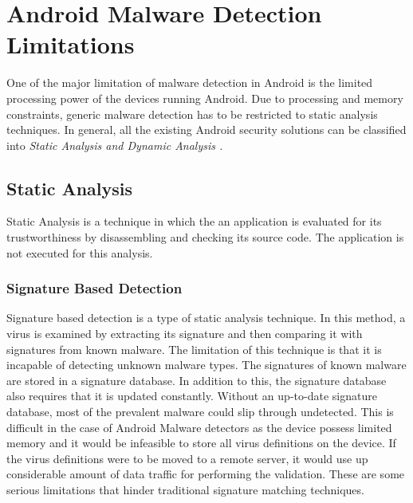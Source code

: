 \section{Android Malware Detection Limitations}
One of the major limitation of malware detection in Android is the limited processing power of the devices running Android. Due to processing and memory constraints, generic malware detection has to be restricted to static analysis techniques. In general, all the existing Android security solutions can be classified into \em{Static Analysis} and \em{Dynamic Analysis} \cite{arshad}.

\subsection{Static Analysis}
Static Analysis is a technique in which the an application is evaluated for its trustworthiness by disassembling and checking its source code. The application is not executed for this analysis. 
\subsubsection{Signature Based Detection}
Signature based detection is a type of static analysis technique. In this method, a virus is examined by extracting its signature and then comparing it with signatures from known malware. The limitation of this technique is that it is incapable of detecting unknown malware types. The signatures of known malware are stored in a signature database. In addition to this, the signature database also requires that it is updated constantly. Without an up-to-date signature database, most of the prevalent malware could slip through undetected. This is difficult in the case of Android Malware detectors as the device possess limited memory and it would be infeasible to store all virus definitions on the device. If the virus definitions were to be moved to a remote server, it would use up considerable amount of data traffic for performing the validation. These are some serious limitations that hinder traditional signature matching techniques.
